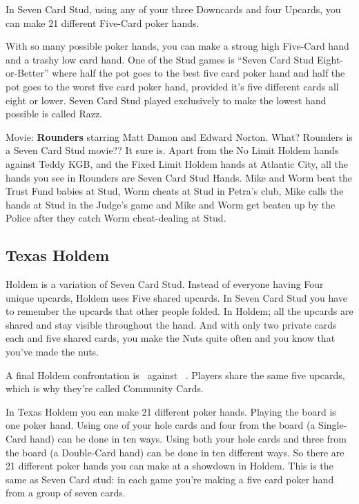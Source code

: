 
In Seven Card Stud, using any of your three Downcards and four
Upcards, you can make 21 different Five-Card poker hands.

With so many possible poker hands, you can make a strong high
Five-Card hand and a trashy low card hand. One of the Stud games is
``Seven Card Stud Eight-or-Better'' where half the pot goes to the
best five card poker hand and half the pot goes to the worst five card
poker hand, provided it's five different cards all eight or lower.
Seven Card Stud played exclusively to make the lowest hand possible is
called Razz.

Movie: \textbf{Rounders} starring Matt Damon and Edward Norton.
What? Rounders is a Seven Card Stud movie?? It sure is. Apart from the
No Limit Holdem hands against Teddy KGB, and the Fixed Limit Holdem
hands at Atlantic City, all the hands you see in Rounders are Seven
Card Stud Hands. Mike and Worm beat the Trust Fund babies at Stud,
Worm cheats at Stud in Petra's club, Mike calls the hands at Stud in
the Judge's game and Mike and Worm get beaten up by the Police after
they catch Worm cheat-dealing at Stud.

\subsection{Texas Holdem}

Holdem is a variation of Seven Card Stud. Instead of everyone
having Four unique upcards, Holdem uses Five shared upcards. In Seven
Card Stud you have to remember the upcards that other people
folded. In Holdem; all the upcards are shared and stay visible
throughout the hand. And with only two private cards each and five
shared cards, you make the Nuts quite often and you know that you've
made the nuts.

A final Holdem confrontation is
\back\back\nines\Qd\Jd\tres\fourc\ against
\back\back\nines\Qd\Jd\tres\fourc\ . Players share the same five
upcards, which is why they're called Community Cards.

In Texas Holdem you can make 21 different poker hands. Playing the
board is one poker hand. Using one of your hole cards and four from the
board (a Single-Card hand) can be done in ten ways. Using both your
hole cards and three from the board (a Double-Card hand) can be done
in ten different ways. So there are 21 different poker hands you can
make at a showdown in Holdem. This is the same as Seven Card
stud: in each game you're making a five card poker hand from a
group of seven cards.

